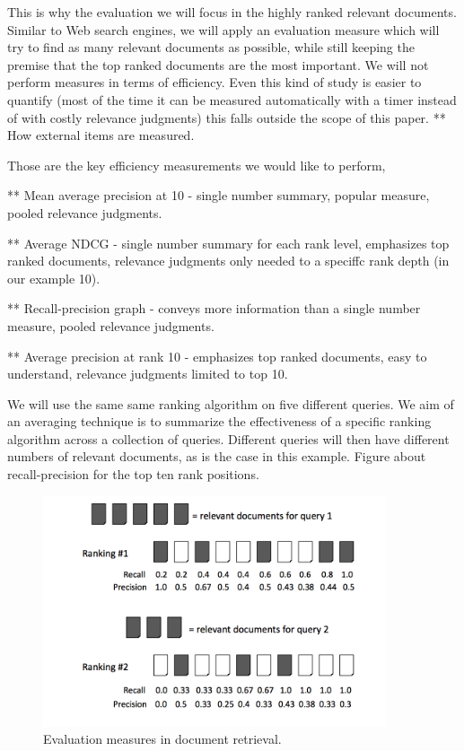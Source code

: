 \documentclass{llncs}
\begin{document}
This is why  the evaluation we will focus in the highly ranked relevant documents. Similar to Web search engines, we will apply an evaluation measure which will try to find as many relevant documents as possible, while still keeping the  premise that the top ranked documents are the most important. We will not perform measures in terms of efficiency. Even this kind of study is easier to quantify (most of the time it can be measured automatically with a timer instead of with costly relevance judgments) this falls outside the scope of this paper. 
** How external items are measured.

Those are the key efficiency measurements we would like to perform, 

** Mean average precision at 10  - single number summary, popular measure, pooled
relevance judgments.

** Average NDCG - single number summary for each rank level, emphasizes top ranked documents, relevance judgments only needed to a speciffc rank depth
(in our example 10).

** Recall-precision graph - conveys more information than a single number measure, pooled relevance judgments.

** Average precision at rank 10 - emphasizes top ranked documents, easy to understand, relevance judgments limited to top 10.

We will use the same same ranking algorithm on five different queries. We aim of an averaging technique is to summarize the effectiveness of a specific ranking algorithm across a collection of queries. Different queries will then have different numbers of relevant documents, as is the case in this example. Figure about recall-precision for the top ten rank positions.

\begin{figure}[h!]
\centering
\includegraphics[width=0.9\textwidth]{figure/cumulativeGain}
\caption{Evaluation measures in document retrieval.}
\label{fig:namedCumulativeGain}%
\end{figure}
\end{document}
